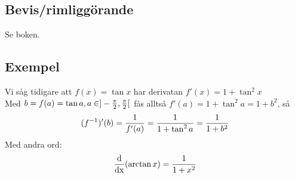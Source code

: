 \documentclass{article}
\begin{document}
\subsection{Bevis/rimliggörande}
Se boken.

\subsection{Exempel}
Vi såg tidigare att $f(x)=\tan x$ har derivatan $f'(x)=1+\tan^2 x$\\
Med $b=f(a)=\tan a, a\in ]-\frac{\pi}{2}, \frac{\pi}{2}[$ fås alltså
$ f'(a) = 1+\tan^2 a = 1+b^2$, så
$$ (f^{-1})'(b) = \frac{1}{f'(a)} = \frac{1}{1+\tan^2 a} = \frac{1}{1+b^2}$$
Med andra ord:
$$ \operatorname{\frac{d}{dx}}(\arctan x) = \frac{1}{1+x^2}$$
\end{document}
